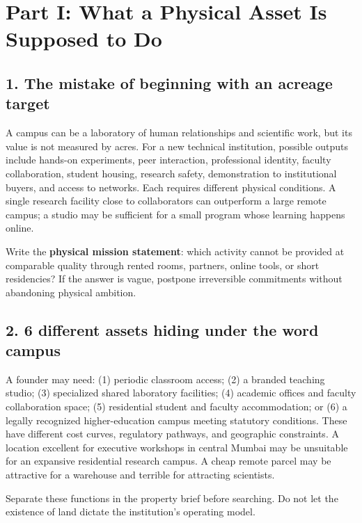 \section*{Part I: What a Physical Asset Is Supposed to Do}


\subsection{1. The mistake of beginning with an acreage target}

A campus can be a laboratory of human relationships and scientific work, but its value is not measured by acres. For a new technical institution, possible outputs include hands-on experiments, peer interaction, professional identity, faculty collaboration, student housing, research safety, demonstration to institutional buyers, and access to networks. Each requires different physical conditions. A single research facility close to collaborators can outperform a large remote campus; a studio may be sufficient for a small program whose learning happens online.

Write the \textbf{physical mission statement}: which activity cannot be provided at comparable quality through rented rooms, partners, online tools, or short residencies? If the answer is vague, postpone irreversible commitments without abandoning physical ambition.


\subsection{2. 6 different assets hiding under the word campus}

A founder may need: (1) periodic classroom access; (2) a branded teaching studio; (3) specialized shared laboratory facilities; (4) academic offices and faculty collaboration space; (5) residential student and faculty accommodation; or (6) a legally recognized higher-education campus meeting statutory conditions. These have different cost curves, regulatory pathways, and geographic constraints. A location excellent for executive workshops in central Mumbai may be unsuitable for an expansive residential research campus. A cheap remote parcel may be attractive for a warehouse and terrible for attracting scientists.

Separate these functions in the property brief before searching. Do not let the existence of land dictate the institution's operating model.


